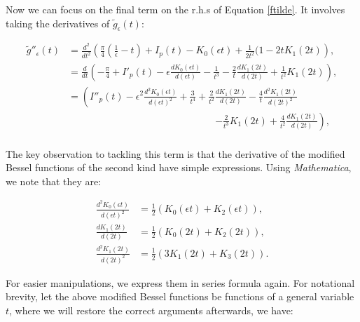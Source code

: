 \documentclass{article}
\numberwithin{equation}{section} %
\begin{document}
Now we can focus on the final term on the r.h.s of Equation \ref{ftilde}. It involves taking the derivatives of $\tilde{g}_\epsilon(t)$:

\begin{equation}
\begin{split}
\tilde{g}''_\epsilon(t) &= \frac{d^2}{dt^2}\left( \frac{\pi}{4}\left( \frac{1}{\epsilon} - t \right) + I_p(t) - K_0(\epsilon t) + \frac{1}{2t^2}(1 - 2tK_1(2t) \right),\\
&=\frac{d}{dt}\left(-\frac{\pi}{4} + I'_p(t) - \epsilon\frac{dK_0(\epsilon t)}{d(\epsilon t)} - \frac{1}{t^3} - \frac{2}{t}\frac{dK_1(2t)}{d(2t)} + \frac{1}{t^2}K_1(2t) \right),\\
&=\left(I''_p(t) - \epsilon^2\frac{d^2K_0(\epsilon t)}{d(\epsilon t)^2} + \frac{3}{t^4} + \frac{2}{t^2}\frac{dK_1(2t)}{d(2t)} - \frac{4}{t}\frac{d^2K_1(2t)}{d(2t)^2} \right.\\
& \quad \quad \quad \quad \quad \quad \quad \quad \quad \quad \quad \quad \quad \quad \quad  \left. - \frac{2}{t^3}K_1(2t) + \frac{4}{t^2}\frac{dK_1(2t)}{d(2t)}  \right),\\
\end{split}
\label{lim 3}
\end{equation}

\noindent The key observation to tackling this term is that the derivative of the modified Bessel functions of the second kind have simple expressions. Using \textit{Mathematica}, we note that they are:

\begin{equation}
\begin{split}
\frac{d^2K_0(\epsilon t)}{d(\epsilon t)^2} &= \frac{1}{2}( K_0(\epsilon t) + K_2(\epsilon t)),\\
\frac{dK_1(2t)}{d(2t)} &= \frac{1}{2}(K_0(2t) + K_2(2t)),\\
\frac{d^2K_1(2t)}{d(2t)^2} &= \frac{1}{2}(3K_1(2t) + K_3(2t)). 
\end{split}
\end{equation}

\noindent For easier manipulations, we express them in series formula again. For notational brevity, let the above modified Bessel functions be functions of a general variable $t$, where we will restore the correct arguments afterwards, we have:
\end{document}

